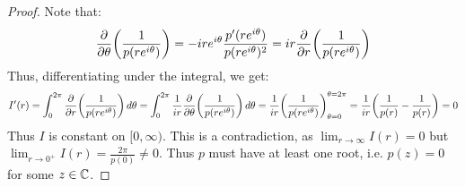\documentclass[main.tex]{subfiles}
\begin{document}
\begin{proof}
    Note that:
    \begin{equation*}
        \pdv{\theta}(\frac{1}{p(re^{i\theta})})
        = -ire^{i\theta}\frac{p'(re^{i\theta})}{p(re^{i\theta})^2}
        = ir\pdv{r}(\frac{1}{p(re^{i\theta})})
    \end{equation*}
    Thus, differentiating under the integral, we get:
    \begin{equation*}
        I'(r)
        = \int_0^{2\pi} \pdv{r}(\frac{1}{p(re^{i\theta})})\,d\theta
        = \int_0^{2\pi} \frac{1}{ir}\pdv{\theta}(\frac{1}{p(re^{i\theta})})\,d\theta
        = \frac{1}{ir}\qty(\frac{1}{p(re^{i\theta})})_{\theta=0}^{\theta=2\pi}
        = \frac{1}{ir}\qty(\frac{1}{p(r)}-\frac{1}{p(r)})
        = 0
    \end{equation*}
    Thus $I$ is constant on $[0,\infty)$. This is a contradiction, as $\lim_{r\to\infty} I(r)=0$ but $\lim_{r\to 0^+} I(r)=\frac{2\pi}{p(0)}\ne 0$. Thus $p$ must have at least one root, i.e. $p(z)=0$ for some $z\in\C$.
\end{proof}
\end{document}

